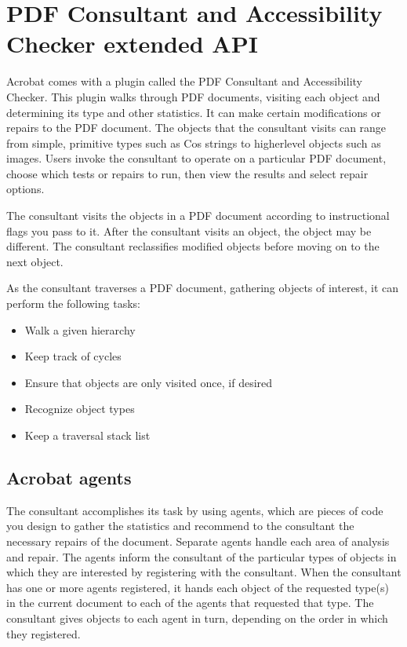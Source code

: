 \documentclass[letterpaper,12pt,english,openany,oneside]{sphinxmanual}
\begin{document}
\section{PDF Consultant and Accessibility Checker extended API}
\label{\detokenize{Plugins_ExtendedAPI:pdf-consultant-and-accessibility-checker-extended-api}}
Acrobat comes with a plugin called the PDF Consultant and Accessibility Checker. This plugin walks through PDF documents, visiting each object and determining its type and other statistics. It can make certain modifications or repairs to the PDF document. The objects that the consultant visits can range from simple, primitive types such as Cos strings to higher\sphinxhyphen{}level objects such as images. Users invoke the consultant to operate on a particular PDF document, choose which tests or repairs to run, then view the results and select repair options.

The consultant visits the objects in a PDF document according to instructional flags you pass to it. After the consultant visits an object, the object may be different. The consultant reclassifies modified objects before moving on to the next object.

As the consultant traverses a PDF document, gathering objects of interest, it can perform the following tasks:
\begin{itemize}
\item {} 
Walk a given hierarchy

\item {} 
Keep track of cycles

\item {} 
Ensure that objects are only visited once, if desired

\item {} 
Recognize object types

\item {} 
Keep a traversal stack list

\end{itemize}


\subsection{Acrobat agents}
\label{\detokenize{Plugins_ExtendedAPI:acrobat-agents}}
The consultant accomplishes its task by using agents, which are pieces of code you design to gather the statistics and recommend to the consultant the necessary repairs of the document. Separate agents handle each area of analysis and repair. The agents inform the consultant of the particular types of objects in which they are interested by registering with the consultant. When the consultant has one or more agents registered, it hands each object of the requested type(s) in the current document to each of the agents that requested that type. The consultant gives objects to each agent in turn, depending on the order in which they registered.
\end{document}

